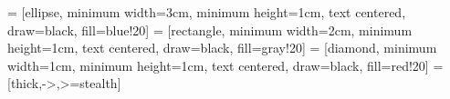 \usepackage{tikz}
\usepackage{subcaption}
\usepackage{pgfplots}
\pgfplotsset{compat=newest}
\usetikzlibrary{
    automata,
    arrows.meta,
    calc,
    shapes.geometric,
    graphs,
    positioning,
    calligraphy,
    decorations.pathreplacing,
    angles,
    external,
    quotes
}
 = [ellipse, minimum width=3cm, minimum height=1cm, text centered, draw=black, fill=blue!20]
 = [rectangle, minimum width=2cm, minimum height=1cm, text centered, draw=black, fill=gray!20]
 = [diamond, minimum width=1cm, minimum height=1cm, text centered, draw=black, fill=red!20]
 = [thick,->,>=stealth]


\usepackage[
  table-parse-only,
  detect-all,
  list-separator = \text{;\ },
  list-units = single,
  range-units = single
]{siunitx}
\usepackage{unicode-math}




